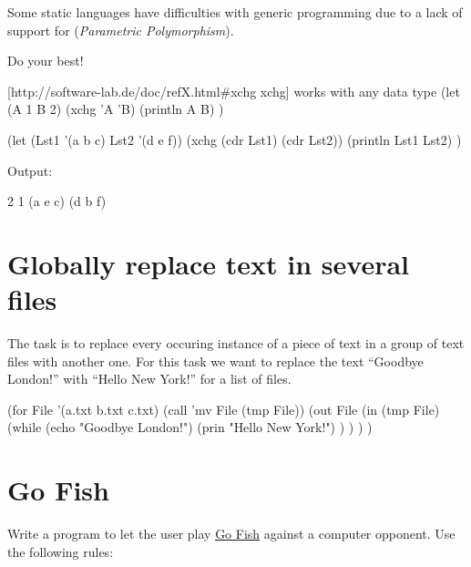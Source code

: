 Some static languages have difficulties with generic programming due
to a lack of support for (\emph{Parametric Polymorphism}).

Do your best!


\begin{wideverbatim}

[http://software-lab.de/doc/refX.html#xchg xchg] works with any data type
(let (A 1  B 2)
   (xchg 'A 'B)
   (println A B) )

(let (Lst1 '(a b c)  Lst2 '(d e f))
   (xchg (cdr Lst1) (cdr Lst2))
   (println Lst1 Lst2) )

Output:

2 1
(a e c) (d b f)

\end{wideverbatim}

\pagebreak{}
\section*{Globally replace text in several files}

The task is to replace every occuring instance of a piece of text in a
group of text files with another one. For this task we want to replace
the text ``Goodbye London!'' with ``Hello New York!'' for a list of
files.

\begin{wideverbatim}

(for File '(a.txt b.txt c.txt)
   (call 'mv File (tmp File))
   (out File
      (in (tmp File)
         (while (echo "Goodbye London!")
            (prin "Hello New York!") ) ) ) )

\end{wideverbatim}

\pagebreak{}
\section*{Go Fish}

Write a program to let the user play
\href{http://en.wikipedia.org/wiki/Go\_Fish}{Go Fish} against a
computer opponent. Use the following rules:

